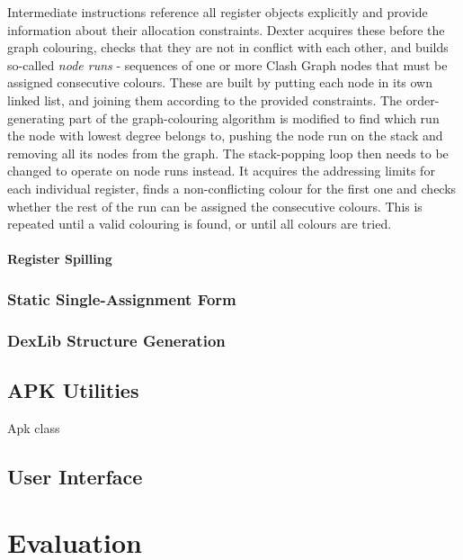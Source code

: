 \documentclass[12pt,twoside,notitlepage]{report}
\begin{document}
Intermediate instructions reference all register objects explicitly and provide information about their allocation constraints. Dexter acquires these before the graph colouring, checks that they are not in conflict with each other, and builds so-called \emph{node runs} - sequences of one or more Clash Graph nodes that must be assigned consecutive colours. These are built by putting each node in its own linked list, and joining them according to the provided constraints. The order-generating part of the graph-colouring algorithm is modified to find which run the node with lowest degree belongs to, pushing the node run on the stack and removing all its nodes from the graph. The stack-popping loop then needs to be changed to operate on node runs instead. It acquires the addressing limits for each individual register, finds a non-conflicting colour for the first one and checks whether the rest of the run can be assigned the consecutive colours. This is repeated until a valid colouring is found, or until all colours are tried.

\subsubsection{Register Spilling}

\subsection{Static Single-Assignment Form}

\subsection{DexLib Structure Generation}

\section{APK Utilities}

Apk class

\section{User Interface}



\cleardoublepage
\chapter{Evaluation}


\cleardoublepage
\end{document}
